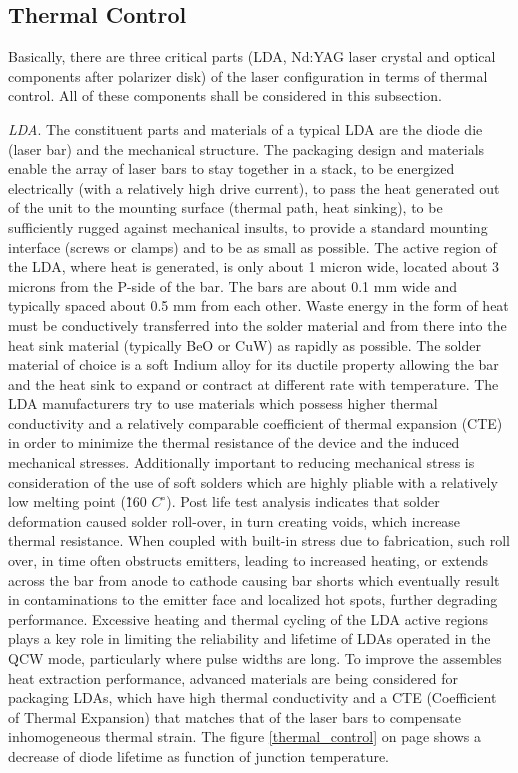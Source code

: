 \subsection{Thermal Control} 
\label{opticalthermal}
Basically, there are three critical parts (\acs{LDA}, Nd:YAG \acs{laser} crystal and optical components after polarizer disk) of the \acs{laser} configuration in terms of thermal control. All of these components shall be considered in this subsection.

\textit{\acs{LDA}}.
The constituent parts and materials of a typical \acs{LDA} are the diode die (laser bar) and the mechanical structure. The packaging design and materials enable the array of laser bars to stay together in a stack, to be energized electrically (with a relatively high drive current), to pass the heat generated out of the unit to the mounting surface (thermal path, heat sinking), to be sufficiently rugged against mechanical insults, to provide a standard mounting interface (screws or clamps) and to be as small as possible. The active region of the \acs{LDA}, where heat is generated, is only about 1 micron wide, located about 3 microns from the P-side of the bar. The bars are about 0.1 mm wide and typically spaced about 0.5 mm from each other. Waste energy in the form of heat must be conductively transferred into the solder material and from there into the heat sink material (typically BeO or CuW) as rapidly as possible. The solder material of choice is a soft Indium alloy for its ductile property allowing the bar and the heat sink to expand or contract at different rate with temperature. The \acs{LDA} manufacturers try to use materials which possess higher thermal conductivity and a relatively comparable coefficient of thermal expansion (CTE) in order to minimize the thermal resistance of the device and the induced mechanical stresses. Additionally important to reducing mechanical stress is consideration of the use of soft solders which are highly pliable with a relatively low melting point (\~ 160 $C^{\circ}$). Post life test analysis indicates that solder deformation caused solder roll-over, in turn creating voids, which increase thermal resistance. When coupled with built-in stress due to fabrication, such roll over, in time often obstructs emitters, leading to increased heating, or extends across the bar from anode to cathode causing bar shorts which eventually result in contaminations to the emitter face and localized hot spots, further degrading performance. Excessive heating and thermal cycling of the \acs{LDA} active regions plays a key role in limiting the reliability and lifetime of \acp{LDA} operated in the QCW mode, particularly where pulse widths are long. To improve the assembles heat extraction performance, advanced materials are being considered for packaging \acp{LDA}, which have high thermal conductivity and a CTE (Coefficient of Thermal Expansion) that matches that of the laser bars to compensate inhomogeneous thermal strain. The figure \ref{thermal_control} on page \pageref{thermal_control} shows a decrease of diode lifetime as function of junction temperature.

